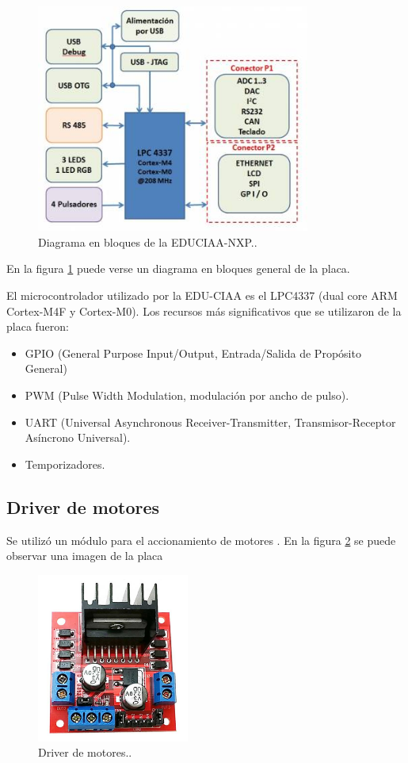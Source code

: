 \begin{figure}[htpb]
	\centering
	\includegraphics[width=9cm]{./Figures/Bloques.jpg}
	\caption{Diagrama en bloques de la EDUCIAA-NXP.\protect\footnotemark.}
	\label{fig:Bloques}
\end{figure}


En la figura \ref{fig:Bloques} puede verse un diagrama en bloques general de la placa. 

El  microcontrolador utilizado por la EDU-CIAA es el LPC4337 (dual core ARM Cortex-M4F y Cortex-M0). Los recursos más significativos que se utilizaron de la placa fueron: 


\begin{itemize}
	\item GPIO (General Purpose Input/Output, Entrada/Salida de Propósito General)
	\item PWM (Pulse Width Modulation, modulación por ancho de pulso).
	\item UART (Universal Asynchronous Receiver-Transmitter, Transmisor-Receptor Asíncrono Universal).
	\item Temporizadores.
\end{itemize}



\subsection{Driver de motores}

Se utilizó un módulo para el accionamiento de motores \citep{Driver}. En la figura \ref{fig:Driver} se puede observar una imagen de la placa 

\begin{figure}[h]
	\centering
	\includegraphics[width=5cm]{./Figures/L298N.png}
	\caption{Driver de motores.\protect\footnotemark.}
	\label{fig:Driver}
\end{figure}



